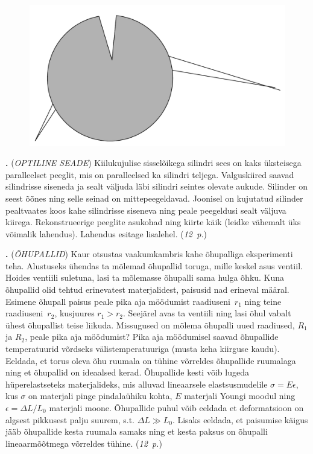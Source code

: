 \documentclass[11pt,a5paper]{article}
\newcommand{\numb}[1]{\vspace{5pt}\textbf{\large #1}}
\newcommand{\nimi}[1]{(\textsl{\small #1})}
\newcommand{\punktid}[1]{(\emph{#1~p.})}
\newcounter{ylesanne}
\newcommand{\yl}[1]{\addtocounter{ylesanne}{1}\numb{\theylesanne.} \nimi{#1} \newblock{}}
\begin{document}
\begin{figure}
  \vspace{-25pt}
  \begin{center}
  \includegraphics[scale=0.25]{optiline-silinder.pdf}
  \end{center}
  \vspace{-25pt}
\end{figure}
\yl{OPTILINE SEADE}
Kiilukujulise sisselõikega silindri sees on kaks üksteisega paralleelset peeglit,
mis on paralleelsed ka silindri teljega. Valguskiired saavad silindrisse siseneda
ja sealt väljuda läbi silindri seintes olevate aukude. Silinder on seest õõnes
ning selle seinad on mittepeegeldavad. Joonisel on kujutatud
silinder pealtvaates koos kahe silindrisse siseneva ning peale peegeldusi sealt
väljuva kiirega. Rekonstrueerige peeglite asukohad ning kiirte käik (leidke
vähemalt üks võimalik lahendus). Lahendus esitage lisalehel.
\punktid{12}

\yl{ÕHUPALLID}
Kaur otsustas vaakumkambris kahe õhupalliga eksperimenti teha. Alustuseks ühendas
ta mõlemad õhupallid toruga, mille keskel asus ventiil. Hoides ventiili suletuna,
lasi ta mõlemasse õhupalli sama hulga õhku. Kuna õhupallid olid tehtud erinevatest
materjalidest, paisusid nad erineval määral. Esimene õhupall paisus peale pika aja
möödumist raadiuseni~$r_1$ ning teine raadiuseni~$r_2$, kusjuures $r_1 > r_2$.
Seejärel avas ta ventiili ning lasi õhul vabalt ühest õhupallist teise liikuda.
Missugused on mõlema õhupalli uued raadiused, $R_1$ ja $R_2$, peale pika aja
möödumist? Pika aja möödumisel saavad õhupallide temperatuurid võrdseks
välistemperatuuriga (musta keha kiirguse kaudu). Eeldada, et torus oleva õhu
ruumala on tühine võrreldes õhupallide ruumalaga ning et õhupallid on ideaalsed
kerad. Õhupallide kesti võib lugeda hüperelastseteks materjalideks, mis alluvad
lineaarsele elastsusmudelile $\sigma = E\epsilon$, kus $\sigma$ on materjali pinge
pindalaühiku kohta, $E$ materjali Youngi moodul ning $\epsilon = \Delta L / L_0$
materjali moone. Õhupallide puhul võib eeldada et deformatsioon on algsest
pikkusest palju suurem, s.t. $\Delta L \gg L_0$. Lisaks eeldada, et paisumise
käigus jääb õhupallide kesta ruumala samaks ning et kesta paksus on õhupalli
lineaarmõõtmega võrreldes tühine.
\punktid{12}
\end{document}
